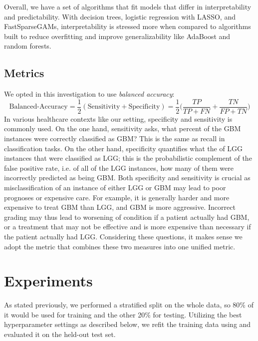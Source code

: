 \documentclass[12pt]{article}
\newtheorem{Proof of Lemma}{Proof of Lemma}
\begin{document}
Overall, we have a set of algorithms that fit models that differ in interpretability and predictability. With decision trees, logistic regression with LASSO, and FastSparseGAMs, interpretability
is stressed more when compared to algorithms built to reduce overfitting and improve generalizability like AdaBoost and random forests. 

\subsection{Metrics}

We opted in this investigation to use \textit{balanced accuracy}: \[\text{Balanced-Accuracy} = \frac{1}{2}(\text{Sensitivity} + \text{Specificity}) = \frac{1}{2}\Bigg(\frac{TP}{TP + FN}+\frac{TN}{FP + TN}\Bigg)\] 
In various healthcare contexts like our setting, specificity and sensitivity is commonly used. On the one hand, sensitivity asks, what percent of the GBM instances were correctly classified as GBM? This is the same 
as recall in classification tasks. On the other hand, specificity quantifies what the of LGG instances that were classified as LGG; this is the probabilistic complement of the false positive rate, i.e. of all of the 
LGG instances, how many of them were incorrectly predicted as being GBM. Both specificity and sensitivity is crucial as misclassification of an instance of either LGG or GBM may lead to poor prognoses or expensive care.
For example, it is generally harder and more expensive to treat GBM than LGG, and GBM is more aggressive. Incorrect grading may thus lead to worsening of condition if a patient actually had GBM, or a treatment that may 
not be effective and is more expensive than necessary if the patient actually had LGG. Considering these questions, it makes sense we adopt the metric that combines these two measures into one unified metric. 

\section{Experiments}

As stated previously, we performed a stratified split on the whole data, so 80\% of it would be used for training and the other 20\% 
for testing. Utilizing the best hyperparameter settings as described below, we refit the training data using and evaluated it on the held-out test set. 

\end{document}
